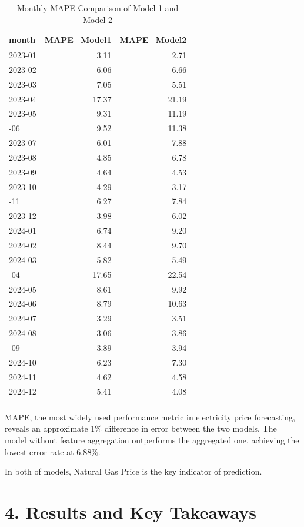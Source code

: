 \documentclass[
  11pt,
  a4paper,
]{article}
\begin{document}
\begin{longtable}[t]{lrr}
\caption{Monthly MAPE Comparison of Model 1 and Model 2}\\
\toprule
month & MAPE\_Model1 & MAPE\_Model2\\
\midrule
2023-01 & 3.11 & 2.71\\
2023-02 & 6.06 & 6.66\\
2023-03 & 7.05 & 5.51\\
2023-04 & 17.37 & 21.19\\
2023-05 & 9.31 & 11.19\\
\addlinespace
2023-06 & 9.52 & 11.38\\
2023-07 & 6.01 & 7.88\\
2023-08 & 4.85 & 6.78\\
2023-09 & 4.64 & 4.53\\
2023-10 & 4.29 & 3.17\\
\addlinespace
2023-11 & 6.27 & 7.84\\
2023-12 & 3.98 & 6.02\\
2024-01 & 6.74 & 9.20\\
2024-02 & 8.44 & 9.70\\
2024-03 & 5.82 & 5.49\\
\addlinespace
2024-04 & 17.65 & 22.54\\
2024-05 & 8.61 & 9.92\\
2024-06 & 8.79 & 10.63\\
2024-07 & 3.29 & 3.51\\
2024-08 & 3.06 & 3.86\\
\addlinespace
2024-09 & 3.89 & 3.94\\
2024-10 & 6.23 & 7.30\\
2024-11 & 4.62 & 4.58\\
2024-12 & 5.41 & 4.08\\
\cellcolor[HTML]{f2f2f2}{\textbf{Average}} & \cellcolor[HTML]{f2f2f2}{\textbf{6.88}} & \cellcolor[HTML]{f2f2f2}{\textbf{7.90}}\\
\bottomrule
\end{longtable}

MAPE, the most widely used performance metric in electricity price
forecasting, reveals an approximate 1\% difference in error between the
two models. The model without feature aggregation outperforms the
aggregated one, achieving the lowest error rate at 6.88\%.

In both of models, Natural Gas Price is the key indicator of prediction.

\section{4. Results and Key Takeaways}\label{results-and-key-takeaways}
\end{document}
